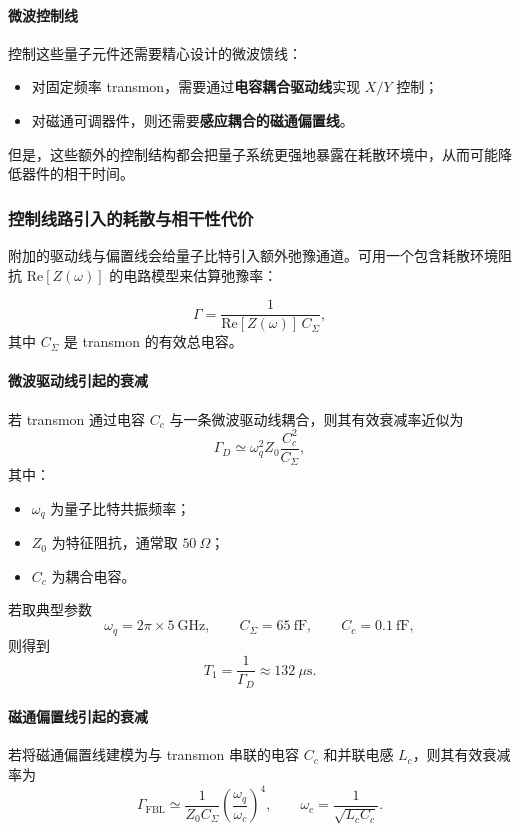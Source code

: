 \documentclass[12pt,a4paper,oneside]{ctexbook}
\begin{document}
\paragraph{微波控制线}
控制这些量子元件还需要精心设计的微波馈线：
\begin{itemize}
    \item 对固定频率 transmon，需要通过\textbf{电容耦合驱动线}实现 \(X/Y\) 控制；
    \item 对磁通可调器件，则还需要\textbf{感应耦合的磁通偏置线}。
\end{itemize}

但是，这些额外的控制结构都会把量子系统更强地暴露在耗散环境中，从而可能降低器件的相干时间。

\subsubsection{控制线路引入的耗散与相干性代价}

附加的驱动线与偏置线会给量子比特引入额外弛豫通道。可用一个包含耗散环境阻抗 \(\mathrm{Re}[Z(\omega)]\) 的电路模型来估算弛豫率：

\begin{equation}
\Gamma = \frac{1}{\mathrm{Re}[Z(\omega)]\,C_{\Sigma}},
\tag{36}
\end{equation}
其中 \(C_{\Sigma}\) 是 transmon 的有效总电容。

\paragraph{微波驱动线引起的衰减}
若 transmon 通过电容 \(C_c\) 与一条微波驱动线耦合，则其有效衰减率近似为
\begin{equation}
\Gamma_D \simeq \omega_q^2 Z_0 \frac{C_c^2}{C_{\Sigma}},
\tag{37}
\end{equation}
其中：
\begin{itemize}
    \item \(\omega_q\) 为量子比特共振频率；
    \item \(Z_0\) 为特征阻抗，通常取 \(50~\Omega\)；
    \item \(C_c\) 为耦合电容。
\end{itemize}

若取典型参数
\[
\omega_q = 2\pi\times 5~\mathrm{GHz},\qquad
C_{\Sigma}=65~\mathrm{fF},\qquad
C_c=0.1~\mathrm{fF},
\]
则得到
\[
T_1 = \frac{1}{\Gamma_D} \approx 132~\mu\mathrm{s}.
\]

\paragraph{磁通偏置线引起的衰减}
若将磁通偏置线建模为与 transmon 串联的电容 \(C_c\) 和并联电感 \(L_c\)，则其有效衰减率为
\begin{equation}
\Gamma_{\mathrm{FBL}} \simeq \frac{1}{Z_0 C_{\Sigma}}
\left(\frac{\omega_q}{\omega_c}\right)^4,
\qquad
\omega_c = \frac{1}{\sqrt{L_c C_c}}.
\tag{38}
\end{equation}
\end{document}
